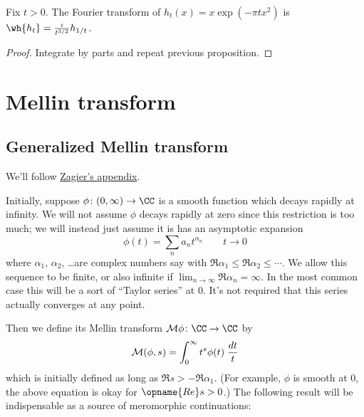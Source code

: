 \begin{proposition}
  Fix $t > 0$.
  The Fourier transform of $h_t(x) = x\exp(-\pi t x^2)$
  is $\wh{h_t} = \frac{i}{t^{3/2}} h_{1/t}$.
\end{proposition}
\begin{proof}
  Integrate by parts and repeat previous proposition.
\end{proof}

\section{Mellin transform}
\subsection{Generalized Mellin transform}
We'll follow
\href{https://people.mpim-bonn.mpg.de/zagier/files/tex/MellinTransform/fulltext.pdf}{Zagier's appendix}.

Initially,
suppose $\phi \colon (0,\infty) \to \CC$ is a smooth function
which decays rapidly at infinity.
We will not assume $\phi$ decays rapidly at zero
since this restriction is too much;
we will instead just assume it is has an asymptotic expansion
\[ \phi(t) = \sum_n a_n t^{\alpha_n} \qquad t \to 0 \]
where $\alpha_1$, $\alpha_2$, \dots are complex numbers
say with $\Re \alpha_1 \le \Re \alpha_2 \le \cdots$.
We allow this sequence to be finite,
or also infinite if $\lim_{n \to \infty} \Re \alpha_n = \infty$.
In the most common case this will be a
sort of ``Taylor series'' at $0$.
It's not required that this series actually
converges at any point.

Then we define its \alert{Mellin transform}
$\MM\phi \colon \CC \to \CC$ by
\[ \mathcal M(\phi, s)
  = \int_0^\infty t^s \phi(t) \; \frac{dt}{t} \]
which is initially defined
as long as $\Re s > -\Re\alpha_1$.
(For example, $\phi$ is smooth at $0$,
the above equation is okay for $\opname{Re} s > 0$.)
The following result will be indispensable
as a source of meromorphic continuations:


